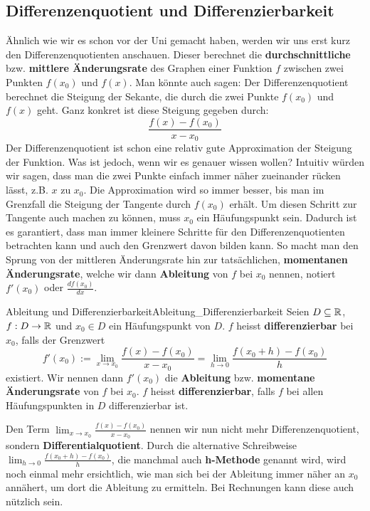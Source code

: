 \subsection{Differenzenquotient und Differenzierbarkeit}
Ähnlich wie wir es schon vor der Uni gemacht haben, werden wir uns erst kurz den Differenzenquotienten anschauen. Dieser berechnet die \textbf{durchschnittliche} bzw. \textbf{mittlere Änderungsrate} des Graphen einer Funktion $f$ zwischen zwei Punkten $f(x_0)$ und $f(x)$. Man könnte auch sagen: Der Differenzenquotient berechnet die Steigung der Sekante, die durch die zwei Punkte $f(x_0)$ und $f(x)$ geht. Ganz konkret ist diese Steigung gegeben durch:
$$\frac{f(x)-f(x_0)}{x-x_0}$$
Der Differenzenquotient ist schon eine relativ gute Approximation der Steigung der Funktion. Was ist jedoch, wenn wir es genauer wissen wollen? Intuitiv würden wir sagen, dass man die zwei Punkte einfach immer näher zueinander rücken lässt, z.B. $x$ zu $x_0$. Die Approximation wird so immer besser, bis man im Grenzfall die Steigung der Tangente durch $f(x_0)$ erhält. Um diesen Schritt zur Tangente auch machen zu können, muss $x_0$ ein Häufungspunkt sein. Dadurch ist es garantiert, dass man immer kleinere Schritte für den Differenzenquotienten betrachten kann und auch den Grenzwert davon bilden kann. So macht man den Sprung von der mittleren Änderungsrate hin zur tatsächlichen, \textbf{momentanen Änderungsrate}, welche wir dann \textbf{Ableitung} von $f$ bei $x_0$ nennen, notiert $f'(x_0)$ oder $\frac{df(x_0)}{dx}$.    
\begin{definition}{Ableitung und Differenzierbarkeit}{Ableitung_Differenzierbarkeit}
Seien $D \subseteq \mathbb{R}$, $f:D \to \mathbb{R}$ und $x_0 \in D$ ein Häufungspunkt von $D$. $f$ heisst \textbf{differenzierbar} bei $x_0$, falls der Grenzwert
$$f'(x_0) := \lim_{x \to x_0}{\frac{f(x)-f(x_0)}{x-x_0}} = \lim_{h \to 0}{\frac{f(x_0 + h)-f(x_0)}{h}}$$
existiert. Wir nennen dann $f'(x_0)$ die \textbf{Ableitung} bzw. \textbf{momentane Änderungsrate} von $f$ bei $x_0$. $f$ heisst \textbf{differenzierbar}, falls $f$ bei allen Häufungspunkten in $D$ differenzierbar ist.
\end{definition}
\begin{remark}
Den Term $\lim_{x \to x_0}{\frac{f(x)-f(x_0)}{x-x_0}}$ nennen wir nun nicht mehr Differenzenquotient, sondern \textbf{Differentialquotient}. Durch die alternative Schreibweise $\lim_{h \to 0}{\frac{f(x_0 + h)-f(x_0)}{h}}$, die manchmal auch \textbf{h-Methode} genannt wird, wird noch einmal mehr ersichtlich, wie man sich bei der Ableitung immer näher an $x_0$ annähert, um dort die Ableitung zu ermitteln. Bei Rechnungen kann diese auch nützlich sein.
\end{remark}
